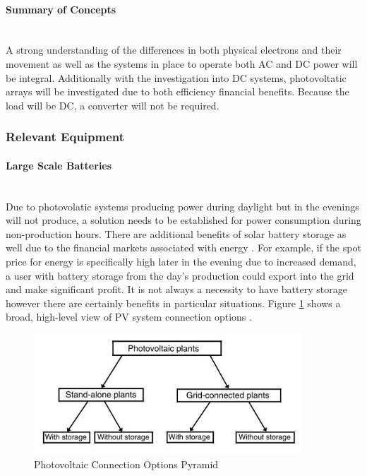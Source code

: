 \paragraph{Summary of Concepts}
~\\
A strong understanding of the differences in both physical electrons and their movement as well as the systems in place to operate both AC and DC power will be integral. Additionally with the investigation into DC systems, photovoltatic arrays will be investigated due to both efficiency financial benefits. Because the load will be DC, a converter will not be required.  


\subsubsection{Relevant Equipment}

\paragraph{Large Scale Batteries}
~\\
Due to photovolatic systems producing power during daylight but in the evenings will not produce, a solution needs to be established for power consumption during non-production hours. There are additional benefits of solar battery storage as well due to the financial markets associated with energy \cite{Haberlin2012}. For example, if the spot price for energy is specifically high later in the evening due to increased demand, a user with battery storage from the day's production could export into the grid and make significant profit. It is not always a necessity to have battery storage however there are certainly benefits in particular situations. Figure \ref{fig:pv-connection-options} shows a broad, high-level view of PV system connection options \cite{Haberlin2012}. 

\begin{figure}[H]
	\hfill\includegraphics[width = 100mm] {images/pv-system-options}\hspace*{\fill}
	\caption{Photovoltaic Connection Options Pyramid \cite{Haberlin2012}}
	\label{fig:pv-connection-options}
\end{figure} 

